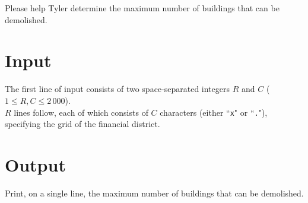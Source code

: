 Please help Tyler determine the maximum number of buildings that can be demolished.

\section*{Input}
The first line of input consists of two space-separated integers $R$ and $C$ ($1 \le R, C \le 2\,000$).\\
$R$ lines follow, each of which consists of $C$ characters (either ``\texttt{x}" or ``\texttt{.}"), specifying the grid of the financial district.

\section*{Output}
Print, on a single line, the maximum number of buildings that can be demolished.\\
